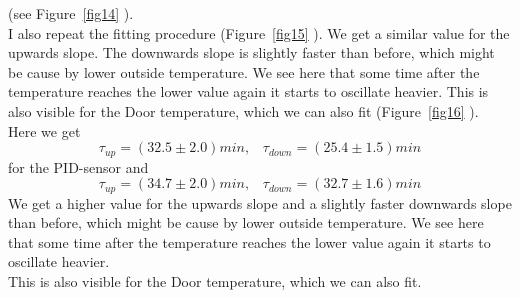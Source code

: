 \documentclass[12pt]{scrartcl}
\begin{document}
      (see Figure~\ref{fig14} ). \\ I also repeat the fitting procedure
      (Figure~\ref{fig15} ). We get a similar value for the upwards slope. The
      downwards slope is slightly faster than before, which might be cause by
      lower outside temperature. We see here that some time after the
      temperature reaches the lower value again it starts to oscillate heavier.
      This is also visible for the Door temperature, which we can also fit
      (Figure~\ref{fig16} ). \\
      Here we get
      $$\tau_{up} = (32.5 \pm 2.0) min, \;\;\; \tau_{down} = (25.4 \pm 1.5) min$$
      for the PID-sensor and
      $$\tau_{up} = (34.7 \pm 2.0) min, \;\;\; \tau_{down} = (32.7 \pm 1.6) min$$
      We get a higher value for the upwards slope and a slightly faster
      downwards slope than before, which might be cause by lower outside
      temperature. We see here that some time after the temperature reaches the
      lower value again it starts to oscillate heavier.\\
      This is also visible for the Door temperature, which we can also fit.
\end{document}
